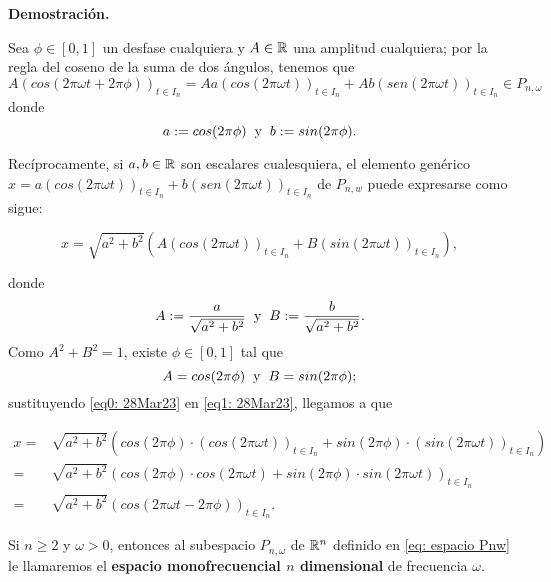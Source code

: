 \noindent
\textbf{Demostración.}

Sea $\phi \in [0,1]$ un desfase cualquiera y $A \in \mathbb{R}$
una amplitud cualquiera; por la regla
del coseno de la suma de dos ángulos, tenemos que
\[
A(cos (2 \pi \omega t + 2 \pi \phi))_{t \in I_{n}}
= Aa  (cos(2 \pi \omega t))_{t \in I_{n}} +
Ab  (sen(2 \pi \omega t))_{t \in I_{n}} \in P_{n, \omega} 
\]
donde
\[
a := cos (2 \pi \phi) \hspace{0.2cm} \text{y}
\hspace{0.2cm} b := sin (2 \pi  \phi).
\]


Recíprocamente, si $a, b \in \mathbb{R}$ son escalares cualesquiera, 
el elemento genérico
$x=  a \left( cos \left(2 \pi \omega t \right) \right)_{t \in I_{n}} +
b ( sen (2 \pi \omega t ))_{t \in I_{n}} $ de $P_{n,w}$ puede
expresarse como sigue:

\begin{equation}
\label{eq1: 28Mar23}
x = \sqrt{a^{2}+b^{2}} \left(
A  \left( cos \left(2 \pi \omega t \right) \right)_{t \in I_{n}} +
B  \left( sin \left(2 \pi \omega t \right) \right)_{t \in I_{n}}
\right),
\end{equation}

\noindent
donde
\[
A := \frac{a}{\sqrt{a^{2}+b^{2}}} \hspace{0.2cm} \text{y} \hspace{0.2cm}
B := \frac{b}{\sqrt{a^{2}+b^{2}}}.
\]
Como $A^{2}+ B^{2}=1$, existe $\phi \in [0,1]$ tal que
\begin{equation}
\label{eq0: 28Mar23}
A = cos (2 \pi \phi) \hspace{0.2cm} \text{y}  \hspace{0.2cm}
B = sin (2 \pi \phi);
\end{equation}
sustituyendo \eqref{eq0: 28Mar23} en \eqref{eq1: 28Mar23}, llegamos
a que

\begin{align*}
x = &  \sqrt{a^{2}+b^{2}} (
cos(2 \pi \phi) \cdot (cos (2 \pi \omega t))_{t \in I_{n}} + 
sin(2 \pi \phi) \cdot (sin (2 \pi \omega t))_{t \in I_{n}} 
) \\
= & \sqrt{a^{2}+b^{2}} (
cos(2 \pi \phi) \cdot cos (2 \pi \omega t) +
sin(2 \pi \phi) \cdot sin (2 \pi \omega t) 
)_{t \in I_{n}}  \\
= &  \sqrt{a^{2}+b^{2}} (
cos (2 \pi \omega t - 2 \pi \phi)
)_{t \in I_{n}}.
\end{align*}

\QEDB
\vspace{0.2cm}

\begin{defi}
Si $n \geq 2$ y $\omega>0$, entonces
al subespacio $P_{n,\omega}$ 
de $\mathbb{R}^{n}$
definido en \eqref{eq: espacio Pnw} 
le llamaremos el \textbf{espacio monofrecuencial
$n$ dimensional} de frecuencia $\omega$.
\end{defi}

